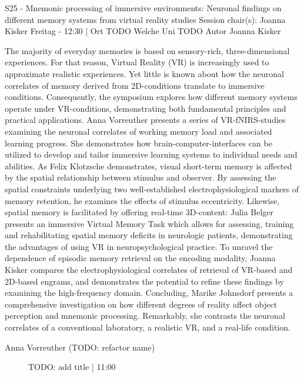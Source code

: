 
            \begin{symposium}
            {S25 - Mnemonic processing of immersive environments: Neuronal findings on different memory systems from virtual reality studies }
            {Session chair(s):  Joanna Kisker }
            {Freitag  - 12:30 | Ort TODO}
            {Welche Uni TODO}
            Autor Joanna Kisker 

The majority of everyday memories is based on sensory-rich, three-dimensional experiences. For that reason, Virtual Reality (VR) is increasingly used to approximate realistic experiences. Yet little is known about how the neuronal correlates of memory derived from 2D-conditions translate to immersive conditions. Consequently, the symposium explores how different memory systems operate under VR-conditions, demonstrating both fundamental principles and practical applications. 
Anna Vorreuther presents a series of VR-fNIRS-studies examining the neuronal correlates of working memory load and associated learning progress. She demonstrates how brain-computer-interfaces can be utilized to develop and tailor immersive learning systems to individual needs and abilities. 
As Felix Klotzsche demonstrates, visual short-term memory is affected by the spatial relationship between stimulus and observer. By assessing the spatial constraints underlying two well-established electrophysiological markers of memory retention, he examines the effects of stimulus eccentricity. 
Likewise, spatial memory is facilitated by offering real-time 3D-content: Julia Belger presents an immersive Virtual Memory Task which allows for assessing, training and rehabilitating spatial memory deficits in neurologic patients, demonstrating the advantages of using VR in neuropsychological practice.
To unravel the dependence of episodic memory retrieval on the encoding modality, Joanna Kisker compares the electrophysiological correlates of retrieval of VR-based and 2D-based engrams, and demonstrates the potential to refine these findings by examining the high-frequency domain.
Concluding, Marike Johnsdorf presents a comprehensive investigation on how different degrees of reality affect object perception and mnemonic processing. Remarkably, she contrasts the neuronal correlates of a conventional laboratory, a realistic VR, and a real-life condition.
            \begin{description}    
            
                \item [Anna Vorreuther  (TODO: refactor name)] TODO: add title \textcolor{mygray}{ | 11:00}    
                

\end{description}
\end{symposium}
